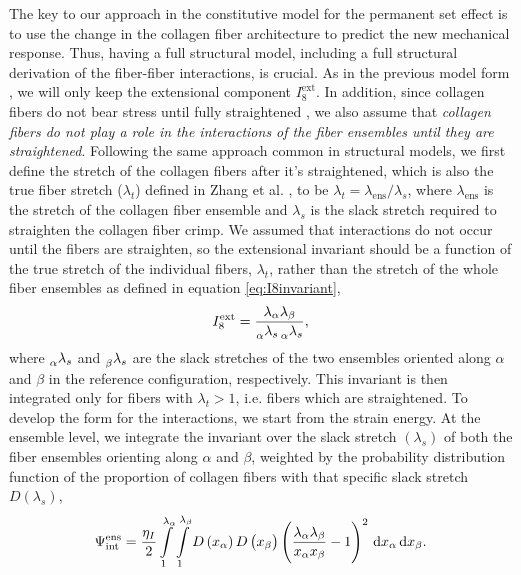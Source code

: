     The key to our approach in the constitutive model for the permanent set effect is to use the change in the collagen fiber architecture to predict the new mechanical response. Thus, having a full structural model, including a full structural derivation of the fiber-fiber interactions, is crucial. As in the previous model form \cite{sacks_novel_2016}, we will only keep the extensional component $I_8^\mathrm{ext}$. In addition, since collagen fibers do not bear stress until fully straightened \cite{soares_biomechanical_2016}, we also assume that \emph{collagen fibers do not play a role in the interactions of the fiber ensembles until they are straightened}. Following the same approach common in structural models, we first define the stretch of the collagen fibers after it's straightened, which is also the true fiber stretch ($\lambda_t$) defined in Zhang et al. \cite{zhang_meso_2016}, to be $\lambda_t = \lambda_\mathrm{ens}/\lambda_s$, where $\lambda_\mathrm{ens}$ is the stretch of the collagen fiber ensemble and $\lambda_s$ is the slack stretch required to straighten the collagen fiber crimp. We assumed that interactions do not occur until the fibers are straighten, so the extensional invariant should be a function of the true stretch of the individual fibers, $\lambda_t$, rather than the stretch of the whole fiber ensembles as defined in equation \ref{eq:I8invariant},
\begin{equation}
I_8^{\mathrm{ext}} = \frac{\lambda_\alpha \lambda_\beta}{\prescript{}{\alpha}{\lambda}_s \prescript{}{\alpha}{\lambda}_s},
\end{equation}
    where $\prescript{}{\alpha}{\lambda}_s$ and $\prescript{}{\beta}{\lambda}_s$ are the slack stretches of the two ensembles oriented along $\alpha$ and $\beta$ in the reference configuration, respectively. This invariant is then integrated only for fibers with $\lambda_t > 1$, i.e. fibers which are straightened. To develop the form for the interactions, we start from the strain energy. At the ensemble level, we integrate the invariant over the slack stretch $(\lambda_s)$ of both the fiber ensembles orienting along $\alpha$ and $\beta$, weighted by the probability distribution function of the proportion of collagen fibers with that specific slack stretch $D(\lambda_s)$,
\begin{equation}
\Psi_{\mathrm{int}}^{\mathrm{ens}} = \frac{\eta_I}{2} \int\displaylimits_1^{\lambda_\alpha} \int\displaylimits_1^{\lambda_\beta} D\left( x_\alpha \right) D\left( x_\beta \right) \left( \frac{\lambda_\alpha \lambda_\beta}{x_\alpha x_\beta} - 1\right)^2 \,\mathrm{d}x_\alpha \,\mathrm{d}x_\beta.
\end{equation}
